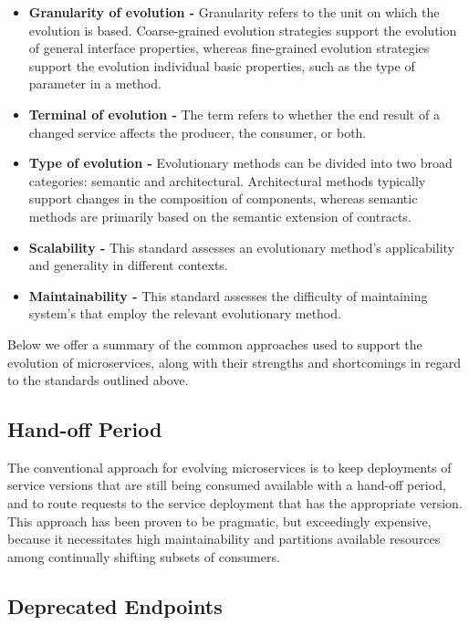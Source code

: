 \begin{itemize}
    \item \textbf{Granularity of evolution -} Granularity refers to the unit on which the evolution is based.
    Coarse-grained evolution strategies support the evolution of general interface properties,
    whereas fine-grained evolution strategies support the evolution individual basic properties, such as the type of parameter in a method.
    \item \textbf{Terminal of evolution -} The term refers to whether the end result of a changed service affects the producer, the consumer, or both.
    \item \textbf{Type of evolution -} Evolutionary methods can be divided into two broad categories: semantic and architectural.
    Architectural methods typically support changes in the composition of components, whereas semantic methods are primarily based on the semantic extension of contracts.
    \item \textbf{Scalability -} This standard assesses an evolutionary method's applicability and generality in different contexts.
    \item \textbf{Maintainability -} This standard assesses the difficulty of maintaining system's that employ the relevant evolutionary method.
\end{itemize}

Below we offer a summary of the common approaches used to support the evolution of microservices,
along with their strengths and shortcomings in regard to the standards outlined above.

\subsection{Hand-off Period} %
\label{sec:hand_off_period}

The conventional approach for evolving microservices is to keep deployments of service versions that are still being consumed available with a hand-off period,
and to route requests to the service deployment that has the appropriate version.
This approach has been proven to be pragmatic, but exceedingly expensive,
because it necessitates high maintainability and partitions available resources among continually shifting subsets of consumers.

\subsection{Deprecated Endpoints} %
\label{sec:deprecated_endpoints}

